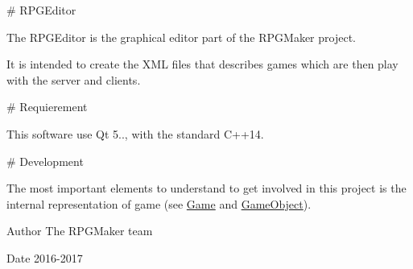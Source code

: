 \# \-R\-P\-G\-Editor

\-The \-R\-P\-G\-Editor is the graphical editor part of the \-R\-P\-G\-Maker project.

\-It is intended to create the \-X\-M\-L files that describes games which are then play with the server and clients.

\# \-Requierement

\-This software use \-Qt 5.., with the standard \-C++14.

\# \-Development

\-The most important elements to understand to get involved in this project is the internal representation of game (see \hyperlink{class_game}{\-Game} and \hyperlink{class_game_object}{\-Game\-Object}).

\begin{DoxyAuthor}{\-Author}
\-The \-R\-P\-G\-Maker team 
\end{DoxyAuthor}
\begin{DoxyDate}{\-Date}
2016-\/2017 
\end{DoxyDate}
